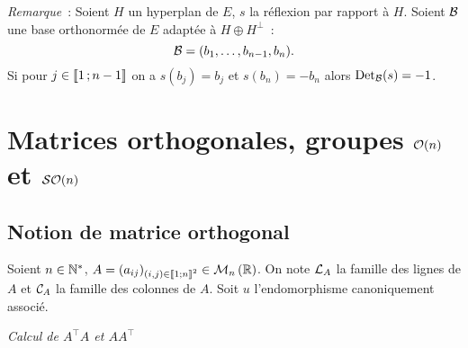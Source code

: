 \emph{Remarque}~: Soient \(H\) un hyperplan de \(E\), \(s\) la réflexion par rapport à \(H\). Soient \(\mathcal{B}\) une base orthonormée de \(E\) adaptée à \(H\oplus H^\perp\)~:
\begin{equation}
  \mathcal{B}=(b_1, \dotsc, b_{n-1}, b_n).
\end{equation}
Si pour \(j \in \mathopen{\llbracket}1\mathclose{}\mathpunct{};n-1\mathclose{\rrbracket}\) on a \(s(b_j)=b_j\) et \(s(b_n)=-b_n\) alors \(\operatorname{Det}_{\mathcal{B}}(s)=-1\).

\section{Matrices orthogonales, groupes \(\mathcal{O}\!\left(n\right)\) et \(\mathcal{SO}\!\left(n\right)\)}

\subsection{Notion de matrice orthogonal}

Soient \(n \in \mathbb{N}^*\), \(A=(a_{ij})_{(i,j) \in \mathopen{\llbracket}1\mathclose{}\mathpunct{};n\mathclose{\rrbracket}^2} \in \mathcal{M}_{n}\left(\mathbb{R}\right)\). On note \(\mathcal{L}_A\) la famille des lignes de \(A\) et \(\mathcal{C}_A\) la famille des colonnes de \(A\). Soit \(u\) l'endomorphisme canoniquement associé.

\emph{Calcul de \(A^\top A\) et \(A A^\top\)}

